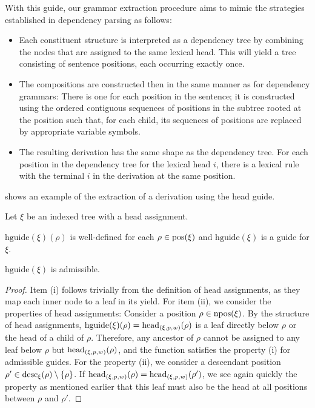 \documentclass[../../document.tex]{subfiles}
\begin{document}
    With this guide, our grammar extraction procedure aims to mimic the strategies established in dependency parsing \citep{kuhlmann2009treebank} as follows:
    \begin{itemize}
        \item Each constituent structure is interpreted as a dependency tree by combining the nodes that are assigned to the same lexical head. This will yield a tree consisting of sentence positions, each occurring exactly once.
        \item The  compositions are constructed then in the same manner as for dependency grammars: There is one for each position in the sentence; it is constructed using the ordered contiguous sequences of positions in the subtree rooted at the position such that, for each child, its sequences of positions are replaced by appropriate variable symbols.
        \item The resulting derivation has the same shape as the dependency tree. For each position in the dependency tree for the lexical head \(i\), there is a lexical rule with the terminal \(i\) in the derivation at the same position.
    \end{itemize}
     shows an example of the extraction of a derivation using the head guide.

    \begin{theorem}
        Let \(\xi\) be an indexed tree with a head assignment.
        \begin{compactenum}
            \item \(\mathrm{hguide}(\xi)(\rho)\) is well-defined for each \(\rho \in \operatorname{pos}(\xi)\) and \(\mathrm{hguide}(\xi)\) is a guide for \(\xi\).
            \item \(\mathrm{hguide}(\xi)\) is admissible.
        \end{compactenum}
    \end{theorem}

    \begin{proof}
        Item (i) follows trivially from the definition of head assignments, as they map each inner node to a leaf in its yield.
        For item (ii), we consider the properties of head assignments:
        Consider a position \(\rho \in \operatorname{npos}(\xi)\).
        By the structure of head assignments, \(\mathrm{hguide}(\xi)(\rho) = \operatorname{head}_{(\xi,p,w)}(\rho)\) is a leaf directly below \(\rho\) or the head of a child of \(\rho\).
        Therefore, any ancestor of \(\rho\) cannot be assigned to any leaf below \(\rho\) but \(\operatorname{head}_{(\xi,p,w)}(\rho)\), and the function satisfies the property (i) for admissible guides.
        For the property (ii), we consider a descendant position \(\rho' \in \operatorname{desc}_\xi(\rho) \setminus \{\rho\}\).
        If \(\operatorname{head}_{(\xi,p,w)}(\rho) = \operatorname{head}_{(\xi,p,w)}(\rho')\), we see again quickly the property as mentioned earlier that this leaf must also be the head at all positions between \(\rho\) and \(\rho'\).
    \end{proof}
\end{document}
